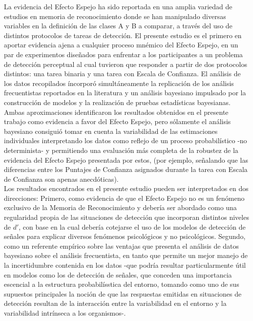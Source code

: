 La evidencia del Efecto Espejo ha sido reportada en una amplia variedad de estudios en memoria de reconocimiento donde se han manipulado diversas variables en la definición de las clases A y B a comparar, a través del uso de distintos protocolos de tareas de detección. El presente estudio es el primero en aportar evidencia ajena a cualquier proceso mnémico del Efecto Espejo, en un par de experimentos diseñados para enfrentar a los participantes a un problema de detección perceptual al cual tuvieron que responder a partir de dos protocolos distintos: una tarea binaria y una tarea con Escala de Confianza. El análisis de los datos recopilados íncorporó simultáneamente la replicación de los análisis frecuentistas reportados en la literatura y un análisis bayesiano impulsado por la construcción de modelos y la realización de pruebas estadísticas bayesianas. Ambas aproximaciones identificaron los resultados obtenidos en el presente trabajo como evidencia a favor del Efecto Espejo, pero sólamente el análisis bayesiano  consiguió tomar en cuenta la variabilidad de las estimaciones individuales interpretando los datos como reflejo de un proceso probabilístico -no determinista- y permitiendo una evaluación más completa de la robustez de la evidencia del Efecto Espejo presentada por estos, (por ejemplo, señalando que las diferencias entre los Puntajes de Confianza asignados durante la tarea con Escala de Confianza son apenas anecdóticas).\\

Los resultados encontrados en el presente estudio pueden ser interpretados en dos direcciones: Primero, como evidencia de que el Efecto Espejo no es un fenómeno exclusivo de la Memoria de Reconocimiento y debería ser abordado como una regularidad propia de las situaciones de detección que incorporan distintos niveles de $d'$, con base en la cual debería cotejarse el uso de los modelos de detección de señales para explicar diversos fenómenos psicológicos y no psicológicos. Segundo, como un referente empírico sobre las ventajas que presenta el análisis de datos bayesiano sobre el análisis frecuentista, en tanto que permite un mejor manejo de la incertidumbre contenida en los datos -que podría resultar particularmente útil en modelos como los de detección de señales, que conceden una importancia escencial a la estructura probabilísstica del entorno, tomando como uno de sus supuestos principales la noción de que las respuestas emitidas en situaciones de detección resultan de la interacción entre la variabilidad en el entorno y la variabilidad intrínseca a los organismos-.\\
